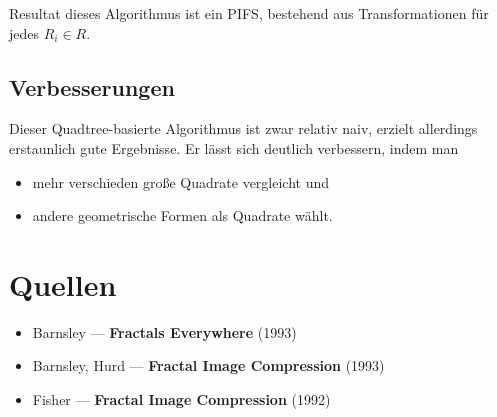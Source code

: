 \documentclass[afourpaper]{tufte-handout}
\begin{document}
Resultat dieses Algorithmus ist ein PIFS, bestehend aus Transformationen für jedes \( R_i \in R \).

\subsection{Verbesserungen}

Dieser Quadtree-basierte Algorithmus ist zwar relativ naiv, erzielt allerdings erstaunlich gute Ergebnisse. Er lässt sich deutlich verbessern, indem man

\begin{itemize}
  \item mehr verschieden große Quadrate vergleicht und
  \item andere geometrische Formen als Quadrate wählt.
\end{itemize}


\section{Quellen}

\begin{itemize}
  \item Barnsley --- \textbf{Fractals Everywhere} (1993)
  \item Barnsley, Hurd --- \textbf{Fractal Image Compression} (1993)
  \item Fisher --- \textbf{Fractal Image Compression} (1992)
\end{itemize}
\end{document}
